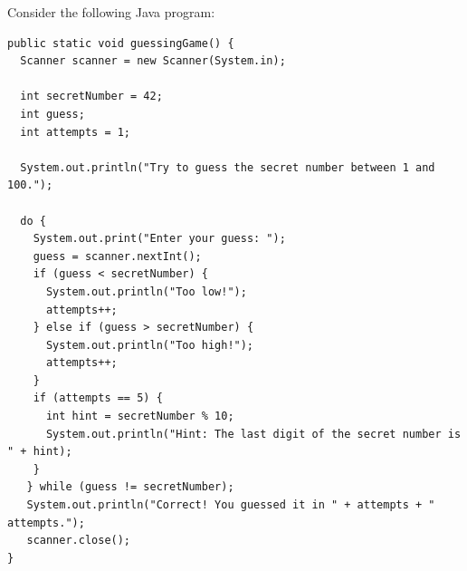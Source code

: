 \documentclass[addpoints]{exam}
\begin{document}
\begin{questions}

\newpage

\question Consider the following Java program:
  \begin{verbatim}
public static void guessingGame() {
  Scanner scanner = new Scanner(System.in);

  int secretNumber = 42;
  int guess;
  int attempts = 1;

  System.out.println("Try to guess the secret number between 1 and 100.");

  do {
    System.out.print("Enter your guess: ");
    guess = scanner.nextInt();
    if (guess < secretNumber) {
      System.out.println("Too low!");
      attempts++;
    } else if (guess > secretNumber) {
      System.out.println("Too high!");
      attempts++;
    }
    if (attempts == 5) {
      int hint = secretNumber % 10;
      System.out.println("Hint: The last digit of the secret number is " + hint);
    }
   } while (guess != secretNumber);
   System.out.println("Correct! You guessed it in " + attempts + " attempts.");
   scanner.close();
}
\end{verbatim}

\end{questions}
\end{document}
